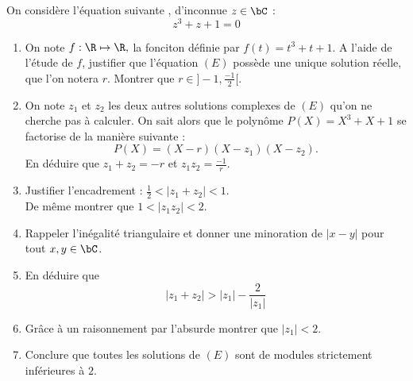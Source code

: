 



\begin{exercice}
On considère l'équation suivante , d'inconnue $z\in \bC$ : 
\begin{equation}\tag{$E$}
z^3 +z+1=0
\end{equation} 



\begin{enumerate}
\item On note $f : \R\mapsto \R, $ la fonciton définie par $f(t) = t^3+t+1.$
A l'aide de l'étude de $f$, justifier que l'équation $(E)$ possède une unique solution réelle, que l'on notera $r$. Montrer que $r \in ]-1, \frac{-1}{2}[$.
\item On note $z_1$ et $z_2$ les deux autres solutions complexes de $(E)$ qu'on ne cherche pas à calculer. On sait alors que le polynôme $P(X) = X^3+X+1$ se factorise de la manière suivante : 
$$P(X)  = (X-r)(X-z_1) (X-z_2).$$
En déduire que $z_1+z_2=-r$ et $z_1z_2=\frac{-1}{r}$.
\item Justifier l'encadrement  : $\frac{1}{2}<|z_1+z_2 |<1.$\\
De même montrer que  $1< |z_1z_2|< 2.$
\item Rappeler l'inégalité triangulaire et donner une minoration de $|x-y|$ pour tout $x,y\in \bC$. 

\item En déduire que $$|z_1+z_2| >|z_1| -\frac{2}{|z_1|}$$

\item Grâce à un raisonnement par l'absurde montrer que $|z_1|<2$.



\item Conclure que toutes les solutions de $(E)$ sont de modules strictement inférieures à $2$. 

%
%


\end{enumerate}

\end{exercice}


